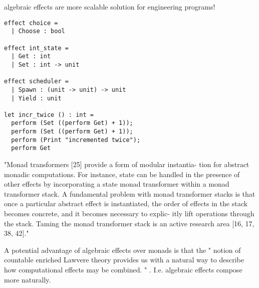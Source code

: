 algebraic effects are more scalable solution for engineering programs!
\begin{verbatim}
effect choice =
  | Choose : bool

effect int_state =
  | Get : int
  | Set : int -> unit

effect scheduler =
  | Spawn : (unit -> unit) -> unit
  | Yield : unit

let incr_twice () : int =
  perform (Set ((perform Get) + 1));
  perform (Set ((perform Get) + 1));
  perform (Print "incremented twice");
  perform Get
\end{verbatim}

"Monad transformers [25] provide a form of modular instantia- tion for abstract monadic computations. For instance, state can be handled in the presence of other effects by incorporating a state monad transformer within a monad transformer stack.
A fundamental problem with monad transformer stacks is that once a particular abstract effect is instantiated, the order of effects in the stack becomes concrete, and it becomes necessary to explic- itly lift operations through the stack. Taming the monad transformer stack is an active research area [16, 17, 38, 42]."
\cite{kammar2013handlers}

A potential advantage of algebraic effects over monads is that
the "
notion of countable enriched Lawvere theory
provides us with a natural way to describe
how computational effects may be combined.
"
\cite{plotkin2004computational}.
I.e. algebraic effects compose more naturally.
